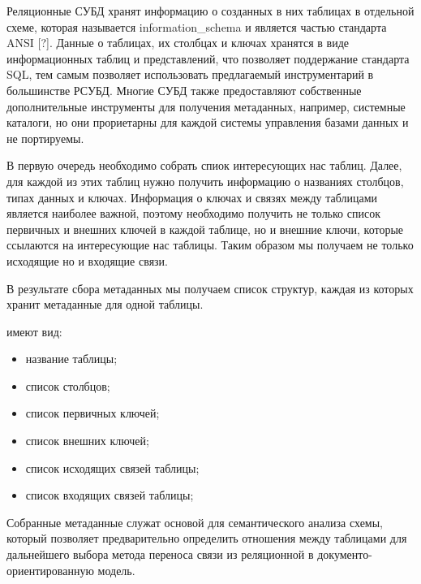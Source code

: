 Реляционные СУБД хранят информацию о созданных в них таблицах в отдельной схеме, 
которая называется information\_schema и является частью стандарта ANSI [?].
Данные о таблицах, их столбцах и ключах хранятся в виде информационных таблиц и представлений, 
что позволяет поддержание стандарта SQL, тем самым позволяет использовать предлагаемый инструментарий в большинстве РСУБД.
Многие СУБД также предоставляют собственные дополнительные инструменты для получения метаданных, например, системные каталоги,
но они прориетарны для каждой системы управления базами данных и не портируемы.

В первую очередь необходимо собрать спиок интересующих нас таблиц.
Далее, для каждой из этих таблиц нужно получить информацию о названиях столбцов, типах данных и ключах.
Информация о ключах и связях между таблицами является наиболее важной, 
поэтому необходимо получить не только список первичных и внешних ключей в каждой таблице, но и внешние ключи, 
которые ссылаются на интересующие нас таблицы.
Таким образом мы получаем не только исходящие но и входящие связи.

В результате сбора метаданных мы получаем список структур, каждая из которых хранит метаданные для одной таблицы.

 имеют вид:
\begin{itemize}[label=---]
    \item название таблицы;
    \item список столбцов; 

    \item список первичных ключей;
    \item список внешних ключей;
    \item список исходящих связей таблицы;
    \item список входящих связей таблицы;
\end{itemize}

Собранные метаданные служат основой для семантического анализа схемы, 
который позволяет предварительно определить отношения между таблицами для 
дальнейшего выбора метода переноса связи из реляционной в документо-ориентированную модель.

